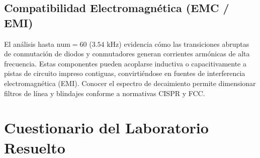 \documentclass[11pt,a4paper]{article}
\begin{document}
\subsection{Compatibilidad Electromagnética (EMC / EMI)}
El análisis hasta $\text{num} = 60$ ($3.54\text{ kHz}$) evidencia cómo las transiciones abruptas de conmutación de diodos y conmutadores generan corrientes armónicas de alta frecuencia. Estas componentes pueden acoplarse inductiva o capacitivamente a pistas de circuito impreso contiguas, convirtiéndose en fuentes de interferencia electromagnética (EMI). Conocer el espectro de decaimiento permite dimensionar filtros de línea y blindajes conforme a normativas CISPR y FCC.

\section{Cuestionario del Laboratorio Resuelto}
\end{document}
